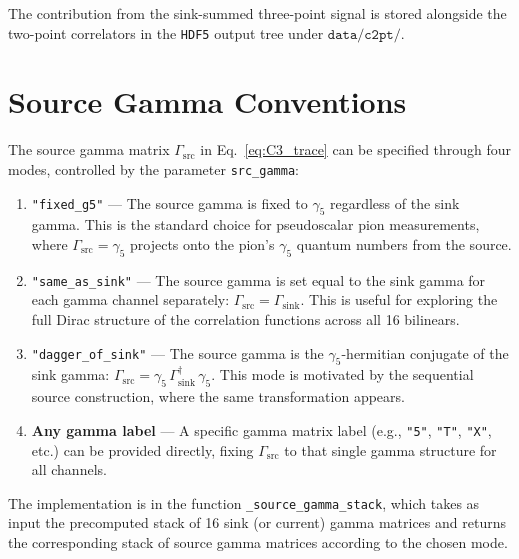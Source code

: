 \documentclass[11pt,a4paper]{article}
\newcommand{\gfive}{\gamma_5}
\newcommand{\gsrc}{\Gamma_{\text{src}}}
\newcommand{\gsink}{\Gamma_{\text{sink}}}
\newcommand{\hdfcmd}{\texttt{HDF5}}
\begin{document}
The contribution from the sink-summed three-point signal is stored alongside
the two-point correlators in the \hdfcmd{} output tree under
\(\texttt{data/c2pt/}\).


\section{Source Gamma Conventions}
\label{sec:src_gamma}

The source gamma matrix \(\gsrc\) in Eq.~\eqref{eq:C3_trace} can be specified
through four modes, controlled by the parameter \texttt{src\_gamma}:

\begin{enumerate}[label=\textbf{Mode \arabic*:}, leftmargin=*, nosep]
  \item \texttt{"fixed\_g5"} --- The source gamma is fixed to \(\gfive\)
        regardless of the sink gamma.  This is the standard choice for
        pseudoscalar pion measurements, where \(\gsrc = \gfive\) projects onto
        the pion's \(\gfive\) quantum numbers from the source.

  \item \texttt{"same\_as\_sink"} --- The source gamma is set equal to the sink
        gamma for each gamma channel separately:
        \(\gsrc = \gsink\).  This is useful for exploring the full Dirac
        structure of the correlation functions across all 16 bilinears.

  \item \texttt{"dagger\_of\_sink"} --- The source gamma is the
        \(\gfive\)-hermitian conjugate of the sink gamma:
        \(\gsrc = \gfive \, \gsink^\dagger \, \gfive\).  This mode is
        motivated by the sequential source construction, where the same
        transformation appears.

  \item \textbf{Any gamma label} --- A specific gamma matrix label (e.g.,
        \texttt{"5"}, \texttt{"T"}, \texttt{"X"}, etc.) can be provided directly,
        fixing \(\gsrc\) to that single gamma structure for all channels.
\end{enumerate}

The implementation is in the function \texttt{\_source\_gamma\_stack}, which
takes as input the precomputed stack of 16 sink (or current) gamma matrices and
returns the corresponding stack of source gamma matrices according to the chosen
mode.
\end{document}
